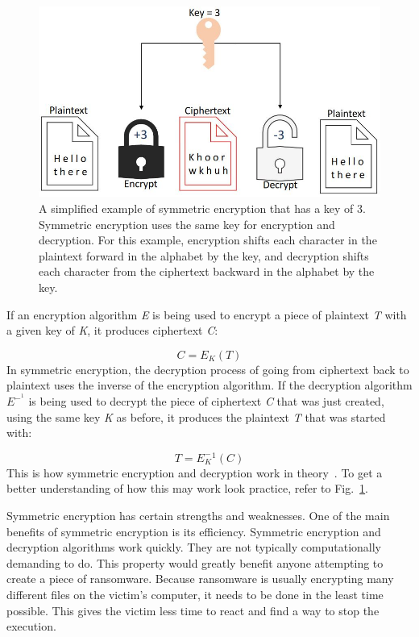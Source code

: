 \documentclass{IEEEtran}
\begin{document}
\begin{figure}[h]
\includegraphics[width=\linewidth]{se.JPG}
  \caption{A simplified example of symmetric encryption that has a key of 3. Symmetric encryption uses the same key for encryption and decryption. For this example, encryption shifts each character in the plaintext forward in the alphabet by the key, and decryption shifts each character from the ciphertext backward in the alphabet by the key.}
  \label{fig:symenc}
\end{figure}

If an encryption algorithm \textit{E} is being used to encrypt a piece of plaintext \textit{T} with a given key of \textit{K}, it produces ciphertext \textit{C}:

\[C = E_K(T) \]\label{eq1} 
In symmetric encryption, the decryption process of going from ciphertext back to plaintext uses the inverse of the encryption algorithm. If the decryption algorithm \textit{\(E^-^1\)} is being used to decrypt the piece of ciphertext \textit{C} that was just created, using the same key \textit{K} as before, it produces the plaintext \textit{T} that was started with:

\[T = E_K^-^1(C) \]\label{eq2}
This is how symmetric encryption and decryption work in theory~\cite{RN30}. To get a better understanding of how this may work look practice, refer to Fig.~\ref{fig:symenc}. 


Symmetric encryption has certain strengths and weaknesses. One of the main benefits of symmetric encryption is its efficiency. Symmetric encryption and decryption algorithms work quickly. They are not typically computationally demanding to do. This property would greatly benefit anyone attempting to create a piece of ransomware. Because ransomware is usually encrypting many different files on the victim's computer, it needs to be done in the least time possible. This gives the victim less time to react and find a way to stop the execution.
\end{document}
